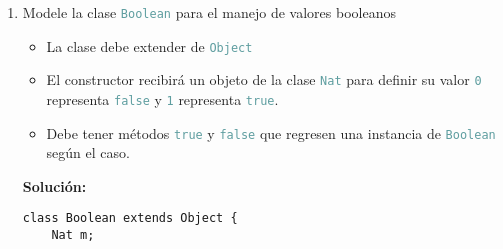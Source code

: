 \documentclass{article}
\newcommand{\tp}[1]{\textcolor{CadetBlue} {\texttt{#1}}}
\newcommand{\tb}[1]{\textcolor{RoyalPurple} {\textbf{#1}}}
\begin{document}
\begin{enumerate}
\begin{enumerate}
\begin{verbatim}
    // método auxiliar para calcular 'not' en Boolean
    Nat inv() {return new Cero(this);}

}

// Clase del Cero definida en las notas
class Cero extends Nat {
    Cero (Object n) {super(n);}

    Nat pred() {return this;}

    Nat suma(Nat n) {return n;}

    Nat multi(Nat n) {return this;}

    /** calcular el caso base del método auxiliar 'flipPot'
    * @param Nat n número del que $this$ es exponente.
    * @return $n^0 = 1 = suc(0) = this.suc()$
    */
    Nat flipPot(Nat n) {return this.suc();}

    /** calcular el caso base del método auxiliar 'lt'
    * $0 < n \iff bool(n) = True$
    * @param Nat n número a comparar
    * @return $this < n$
    */
    Booelan lt(Nat n) {return new Boolean(n);}

    // método auxiliar para calcular 'not' en Boolean
    Nat inv() {return this.suc();}
}
        \end{verbatim}

        Donde \tp{not} está definido como

        \begin{verbatim}
class Boolean extends Object {
    ...
    Boolean not() {return new Boolean(this.m.inv());}
}
        \end{verbatim}

            \item Modele la clase \tp{Boolean} para el manejo de valores
            booleanos
            \begin{itemize}
                \item La clase debe extender de \tp{Object}

                \item El constructor recibirá un objeto de la clase \tp{Nat}
                para definir su valor \tp{0} representa \tp{false} y \tp{1}
                representa \tp{true}.

                \item Debe tener métodos \tp{true} y \tp{false} que regresen una
                instancia de \tp{Boolean} según el caso.
            \end{itemize}

            \tb{Solución:}
            \begin{verbatim}
class Boolean extends Object {
    Nat m;


\end{verbatim}
\end{enumerate}
\end{enumerate}
\end{document}
